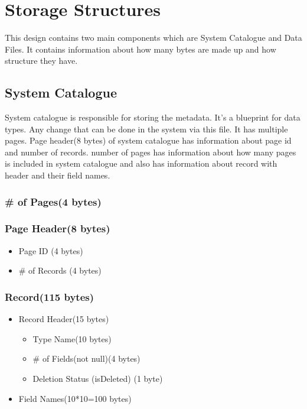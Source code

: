 \documentclass{article}
\begin{document}
\section{Storage Structures}
    This design contains two main components which are System Catalogue and Data Files. It contains information about how many bytes are made up and how structure they have.
    \subsection{System Catalogue}
        System catalogue is responsible for storing the metadata. It's a blueprint for data types. Any change that can be done in the system via this file. It has multiple pages. Page header(8 bytes) of system catalogue has information about page id and number of records. number of pages has information about how many pages is included in system catalogue and also has information about record with header and their field names.
        \subsubsection{\# of Pages(4 bytes)}
        \subsubsection{Page Header(8 bytes)}
            \begin{itemize}
                 \item Page ID (4 bytes)
                 \item \# of Records (4 bytes)
            \end{itemize}
        \subsubsection{Record(115 bytes)}
            \begin{itemize}
                 \item Record Header(15 bytes)
                    \begin{itemize}
                        \item Type Name(10 bytes)
                        \item \# of Fields(not null)(4 bytes)
                        \item Deletion Status (isDeleted) (1 byte)
                    \end{itemize}
                 \item Field Names(10*10=100 bytes)
            \end{itemize}
\end{document}
